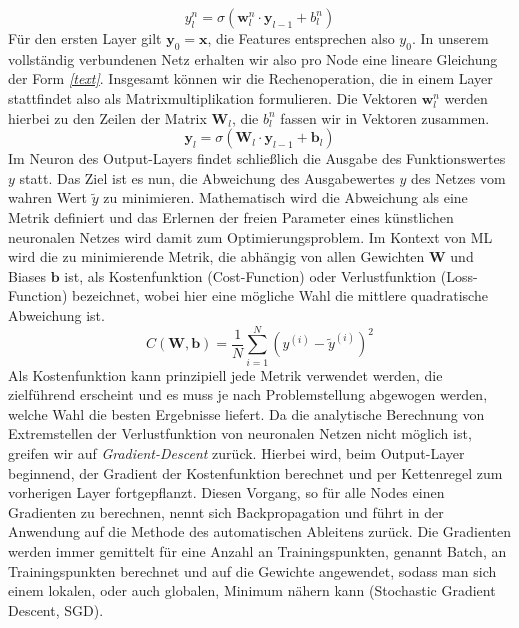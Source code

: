 \begin{equation}
y_l^n = \sigma\left(\mathbf{w}_{l}^n \cdot \mathbf{y}_{l-1} + b_{l}^n\right)
\end{equation}
Für den ersten Layer gilt  $\mathbf{y}_0 = \mathbf{x}$, die Features entsprechen also $y_0$. In unserem vollständig verbundenen Netz erhalten wir also pro Node eine lineare Gleichung der Form \textit{\autoref{text}}. Insgesamt können wir die Rechenoperation, die in einem Layer stattfindet also als Matrixmultiplikation formulieren. Die Vektoren $\mathbf{w}_{l}^n$ werden hierbei zu den Zeilen der Matrix $\mathbf{W}_l$, die  $b_{l}^n$ fassen wir in Vektoren zusammen.
\begin{equation}
\mathbf{y}_l = \sigma\left(\mathbf{W}_l\cdot \mathbf{y}_{l-1} + \mathbf{b}_l\right)
\end{equation}
Im Neuron des Output-Layers findet schließlich die Ausgabe des Funktionswertes $y$ statt. Das Ziel ist es nun, die Abweichung des Ausgabewertes $y$ des Netzes vom wahren Wert $\tilde{y}$ zu minimieren. Mathematisch wird die Abweichung als eine Metrik definiert und das Erlernen der freien Parameter eines künstlichen neuronalen Netzes wird damit zum Optimierungsproblem. Im Kontext von ML wird die zu minimierende Metrik, die abhängig von allen Gewichten $\mathbf{W}$ und Biases $\mathbf{b}$ ist, als Kostenfunktion (Cost-Function) oder Verlustfunktion (Loss-Function) bezeichnet, wobei hier eine mögliche Wahl die mittlere quadratische Abweichung ist.
\begin{equation}
C\left(\mathbf{W}, \mathbf{b}\right) = \frac{1}{N}\sum_{i=1}^{N}\left(y^{(i)} - \tilde{y}^{(i)}\right)^2
\end{equation}
Als Kostenfunktion kann prinzipiell jede Metrik verwendet werden, die zielführend erscheint und es muss je nach Problemstellung abgewogen werden, welche Wahl die besten Ergebnisse liefert.
Da die analytische Berechnung von Extremstellen der Verlustfunktion von neuronalen Netzen nicht möglich ist, greifen wir auf \textit{Gradient-Descent} zurück. Hierbei wird, beim Output-Layer beginnend, der Gradient der Kostenfunktion berechnet und per Kettenregel zum vorherigen Layer fortgepflanzt. Diesen Vorgang, so für alle Nodes einen Gradienten zu berechnen, nennt sich Backpropagation und führt in der Anwendung auf die Methode des automatischen Ableitens zurück. Die Gradienten werden immer gemittelt für eine Anzahl an Trainingspunkten, genannt Batch, an Trainingspunkten berechnet und auf die Gewichte angewendet, sodass man sich einem lokalen, oder auch globalen, Minimum nähern kann (Stochastic Gradient Descent, SGD).
